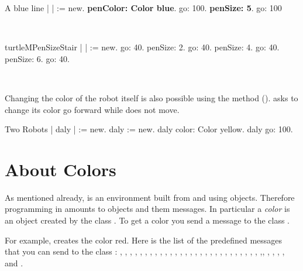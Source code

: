 \begin{scriptwithtitle}{A blue line}\label{scr:blueLine}
| \caro |
\caro := \Turtle new.
\caro \textbf{penColor: Color blue}.
\caro go: 100.
\caro \textbf{penSize: 5}.
\caro go: 100
\end{scriptwithtitle}


\ 


\begin{scriptfig}{turtleMPenSize}{Stair}\label{scr:Stair}
| \caro |
\caro := \Turtle new.
\caro go: 40.
\caro penSize: 2.
\caro go: 40.
\caro penSize: 4.
\caro go: 40.
\caro penSize: 6.
\caro go: 40.
\end{scriptfig}

\ 

Changing the color of the robot itself is also possible using the
method  ().   asks  to change its color go forward\add{,} while \caro does not move.

\begin{scriptwithtitle}{Two Robots}\label{scr:yellowturtle}
| \caro daly |
\caro := \Turtle new.
daly  := \Turtle new.
daly color: Color yellow.
daly go: 100.
\end{scriptwithtitle}

\section{About Colors}

As mentioned already, \sq  is an environment built from and using objects. Therefore programming in \sq amounts to  objects and  them messages. In particular a \emph{color} is an object created by the class . To get a color you  send a message to the class . \add{\paragraph
}

 For example,  creates the color red. Here is the list of the predefined  messages that you can send  to the class  : 
, , , , , , , , , , , , , , , , , , , , , , , , , , , ,  ,, , , , , and .

